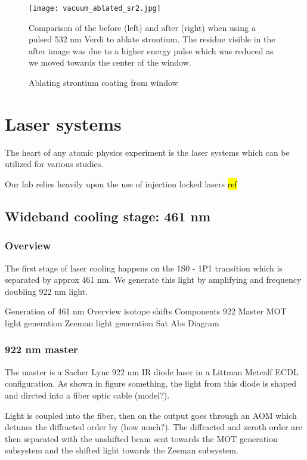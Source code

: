 	\begin{figure}
		\centerline{
		\texttt{[image: vacuum\_ablated\_sr2.jpg]}}
		\caption{Ablating strontium coating from window}{Comparison of the before (left) and after (right) when using a pulsed 532 nm Verdi to ablate strontium. The residue visible in the after image was due to a higher energy pulse which was reduced as we moved towards the center of the window.}
		\label{fig:ablating_strontium}
	\end{figure} 



\section{Laser systems}\label{sec:laser_systems}

The heart of any atomic physics experiment is the laser systems which can be utilized for various studies. 

Our lab relies heavily upon the use of injection locked lasers \hl{ref}

\subsection{Wideband cooling stage: 461 nm}
\label{ssec:461sys}

\subsubsection{Overview}

The first stage of laser cooling happens on the 1S0 - 1P1 transition which is separated by approx 461 nm. We generate this light by amplifying and frequency doubling 922 nm light.

Generation of 461 nm
	Overview
		isotope shifts
	Components
		922 Master
		MOT light generation
		Zeeman light generation
		Sat Abs
	Diagram

\subsubsection{922 nm master}

The master is a Sacher Lync 922 nm IR diode laser in a Littman Metcalf ECDL configuration. 
As shown in figure something, the light from this diode is shaped and dircted into a fiber optic cable (model?). 

Light is coupled into the fiber, then on the output goes through an AOM which detunes the diffracted order by (how much?). The diffracted and zeroth order are then separated with the unshifted beam sent towards the MOT generation subsystem and the shifted light towards the Zeeman subsystem.

